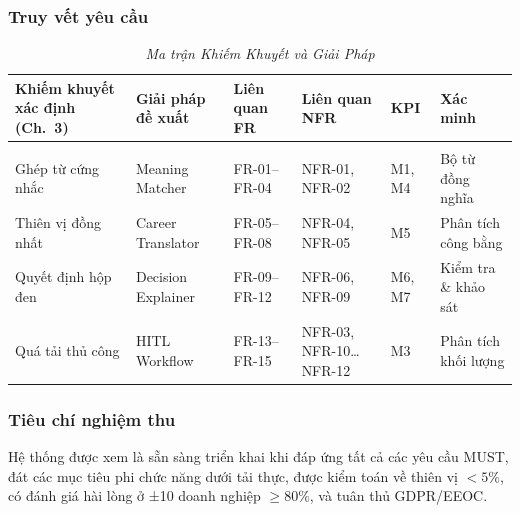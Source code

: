 \documentclass{article}
\begin{document}
\subsubsection{Truy vết yêu cầu}
\begin{longtable}{|
  >{\raggedright\arraybackslash}p{}|
  >{\raggedright\arraybackslash}p{}|
  >{\raggedright\arraybackslash}p{}|
  >{\raggedright\arraybackslash}p{}|
  >{\raggedright\arraybackslash}p{}|
  >{\raggedright\arraybackslash}p{}|}
  \hline
  \textbf{Khiếm khuyết xác định (Ch.~3)} &
  \textbf{Giải pháp đề xuất} &
  \textbf{Liên quan FR} &
  \textbf{Liên quan NFR} &
  \textbf{KPI} &
  \textbf{Xác minh} \\
  \hline
  \endfirsthead

  \endhead

  \hline
  \endfoot

  \hline
  \caption{\centering\textit{Ma trận Khiếm Khuyết và Giải Pháp}}
  \label{tab:defect-solution-matrix} \\
  \endlastfoot

  Ghép từ cứng nhắc &
  Meaning Matcher &
  FR-01--FR-04 &
  NFR-01, NFR-02 &
  M1, M4 &
  Bộ từ đồng nghĩa \\
  \hline

  Thiên vị đồng nhất &
  Career Translator &
  FR-05--FR-08 &
  NFR-04, NFR-05 &
  M5 &
  Phân tích công bằng \\
  \hline

  Quyết định hộp đen &
  Decision Explainer &
  FR-09--FR-12 &
  NFR-06, NFR-09 &
  M6, M7 &
  Kiểm tra \& khảo sát \\
  \hline

  Quá tải thủ công &
  HITL Workflow &
  FR-13--FR-15 &
  NFR-03, NFR-10…NFR-12 &
  M3 &
  Phân tích khối lượng \\

\end{longtable}

\subsubsection{Tiêu chí nghiệm thu}
Hệ thống được xem là sẵn sàng triển khai khi đáp ứng tất cả các yêu cầu MUST, đát các mục tiêu phi chức năng dưới tải thực, được kiểm toán về thiên vị $<5\%$, có đánh giá hài lòng ở ±10 doanh nghiệp $\ge80\%$, và tuân thủ GDPR/EEOC.
\end{document}
